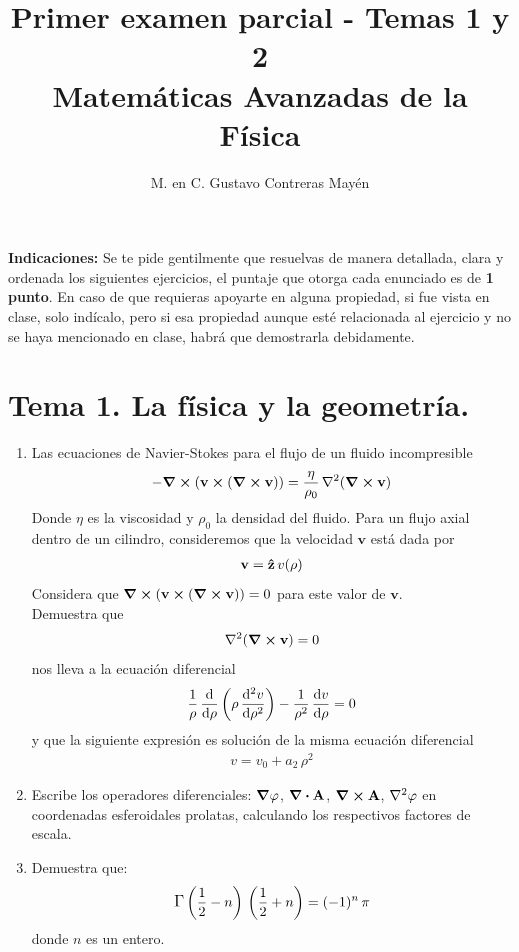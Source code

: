 \documentclass[hidelinks,12pt]{article}
\title{Primer examen parcial - Temas 1 y 2 \\[0.3em]  \large{Matemáticas Avanzadas de la Física}\vspace{-3ex}}
\author{M. en C. Gustavo Contreras Mayén}
\date{ }
\begin{document}
\vspace{-4cm}
\maketitle

\fontsize{14}{14}\selectfont

\textbf{Indicaciones: } Se te pide gentilmente que resuelvas de manera detallada, clara y ordenada los siguientes ejercicios, el puntaje que otorga cada enunciado es de \textbf{1 punto}. En caso de que requieras apoyarte en alguna propiedad, si fue vista en clase, solo indícalo, pero si esa propiedad aunque esté relacionada al ejercicio y no se haya mencionado en clase, habrá que demostrarla debidamente.

\section{Tema 1. La física y la geometría.}
\begin{enumerate}
\item Las ecuaciones de Navier-Stokes para el flujo de un fluido incompresible
    \begin{align*}
    - \curl{( \mathbf{v} \cp (\curl{\vb{v}}))} =  \dfrac{\eta}{\rho_{0}} \, \laplacian{(\curl{\vb{v}})}
    \end{align*}
    Donde $\eta$ es la viscosidad y $\rho_{0}$ la densidad del fluido. Para un flujo axial dentro de un cilindro, consideremos que la velocidad $\mathbf{v}$ está dada por
    \begin{align*}
        \mathbf{v} =  \vu{z} \, v (\rho)
    \end{align*}
    Considera que $\curl{( \mathbf{v} \cp (\curl{\vb{v}}))} = 0$ para este valor de $\mathbf{v}$.
    \\
    Demuestra que
    \begin{align*}
        \laplacian{( \curl{\vb{v}} )} = 0
    \end{align*}
    nos lleva a la ecuación diferencial
    \begin{align*}
        \dfrac{1}{\rho} \, \dv{\rho} \left( \rho \, \dv[2]{v}{\rho} \right) -  \dfrac{1}{\rho^{2}} \, \dv{v}{\rho} = 0
    \end{align*}
    y que la siguiente expresión es solución de la misma ecuación diferencial
    \begin{align*}
        v = v_{0} + a_{2} \, \rho^{2}
    \end{align*}
    \item Escribe los operadores diferenciales: $\grad{\varphi}$, $\div{\vb{A}}$, $\curl{\vb{A}}$, $\laplacian{\varphi}$ en coordenadas esferoidales prolatas, calculando los respectivos factores de escala.
    \item Demuestra que:
    \begin{align*}
        \mathlarger{\Gamma} \left( \dfrac{1}{2} - n \right) \, \left( \dfrac{1}{2} + n \right) = (-1)^{n} \, \pi
    \end{align*}
    donde $n$ es un entero.
    \end{enumerate}
\end{document}
